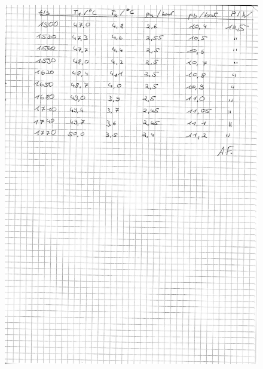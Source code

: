 \begin{figure}[htp]
  \centering
  \includegraphics[width=\textwidth]{content/originaldaten/4.jpg}
\end{figure}
